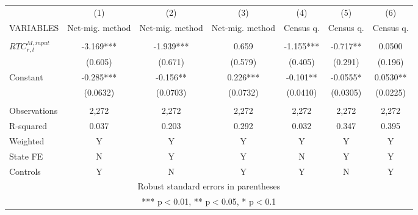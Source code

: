\begin{tabular}{lcccccc} \hline
 & (1) & (2) & (3) & (4) & (5) & (6) \\
VARIABLES & Net-mig. method & Net-mig. method & Net-mig. method & Census q. & Census q. & Census q. \\ \hline
 &  &  &  &  &  &  \\
$ RTC_{r,t}^{M,input}$ & -3.169*** & -1.939*** & 0.659 & -1.155*** & -0.717** & 0.0500 \\
 & (0.605) & (0.671) & (0.579) & (0.405) & (0.291) & (0.196) \\
Constant & -0.285*** & -0.156** & 0.226*** & -0.101** & -0.0555* & 0.0530** \\
 & (0.0632) & (0.0703) & (0.0732) & (0.0410) & (0.0305) & (0.0225) \\
 &  &  &  &  &  &  \\
Observations & 2,272 & 2,272 & 2,272 & 2,272 & 2,272 & 2,272 \\
R-squared & 0.037 & 0.203 & 0.292 & 0.032 & 0.347 & 0.395 \\
Weighted & Y & Y & Y & Y & Y & Y \\
State FE & N & Y & Y & N & Y & Y \\
 Controls & Y & N & Y & Y & N & Y \\ \hline
\multicolumn{7}{c}{ Robust standard errors in parentheses} \\
\multicolumn{7}{c}{ *** p$<$0.01, ** p$<$0.05, * p$<$0.1} \\
\end{tabular}
